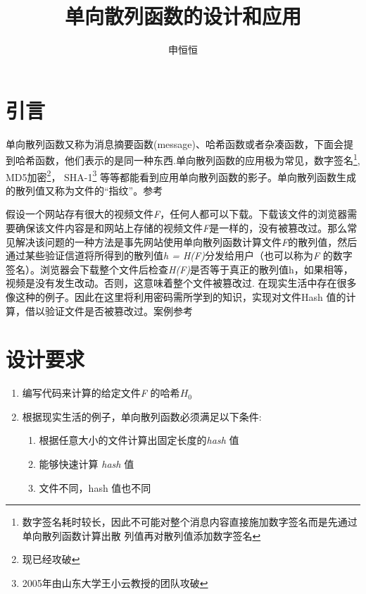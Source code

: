 \documentclass[hyperref,]{ctexart}
\title{单向散列函数的设计和应用}
\author{申恒恒}
\date{}
\providecommand{\tightlist}{%
  \setlength{\itemsep}{0pt}\setlength{\parskip}{0pt}}
\begin{document}
\maketitle

\section{引言}

单向散列函数又称为消息摘要函数(message)、哈希函数或者杂凑函数，下面会提到哈希函数，他们表示的是同一种东西.单向散列函数的应用极为常见，数字签名\footnote{数字签名耗时较长，因此不可能对整个消息内容直接施加数字签名而是先通过单向散列函数计算出散
  列值再对散列值添加数字签名}, MD5加密\footnote{现已经攻破}，
SHA-1\footnote{2005年由山东大学王小云教授的团队攻破}
等等都能看到应用单向散列函数的影子。单向散列函数生成的散列值又称为文件的``指纹''。参考

假设一个网站存有很大的视频文件\emph{F}，任何人都可以下载。下载该文件的浏览器需要确保该文件内容是和网站上存储的视频文件\emph{F}是一样的，没有被篡改过。那么常见解决该问题的一种方法是事先网站使用单向散列函数计算文件\emph{F}的散列值，然后通过某些验证信道将所得到的散列值\emph{h
= H(F)}分发给用户（也可以称为\emph{F}
的数字签名）。浏览器会下载整个文件后检查\emph{H(F)}是否等于真正的散列值h，如果相等，视频是没有发生改动。否则，这意味着整个文件被篡改过.
在现实生活中存在很多像这种的例子。因此在这里将利用密码需所学到的知识，实现对文件Hash
值的计算，借以验证文件是否被篡改过。案例参考

\section{设计要求}

\begin{enumerate}
\def\labelenumi{\arabic{enumi}.}
\tightlist
\item
  编写代码来计算的给定文件\emph{F} 的哈希\(H_0\)
\item
  根据现实生活的例子，单向散列函数必须满足以下条件:

  \begin{enumerate}
  \def\labelenumii{\arabic{enumii}.}
  \tightlist
  \item
    根据任意大小的文件计算出固定长度的\emph{hash} 值
  \item
    能够快速计算 \emph{hash} 值
  \item
    文件不同，hash 值也不同
  \end{enumerate}
\end{enumerate}
\end{document}
